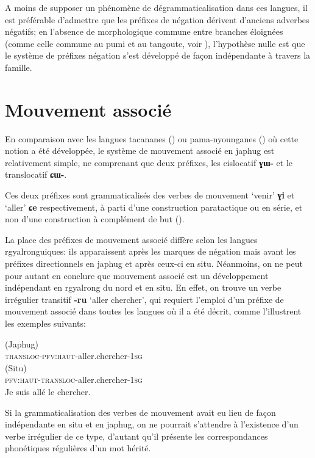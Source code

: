 \documentclass[oldfontcommands,oneside,a4paper,11pt]{article}
\newcommand{\ipa}[1]{{\phon\textbf{\mbox{#1}}}} %
\begin{document}
A moins de supposer un phénomène de dégrammaticalisation dans ces langues, il est préférable d'admettre que les préfixes de négation dérivent d'anciens adverbes négatifs; en l'absence de morphologique  commune entre branches éloignées (comme celle commune au pumi et au tangoute, voir \citealt{jacques11tangut.verb}), l'hypothèse nulle est que le système de préfixes négation s'est développé de façon indépendante à travers la famille.

\section{Mouvement associé} 
En comparaison avec les langues tacananes (\citealt{guillaume09mouv.assoc}) ou pama-nyounganes (\citealt{koch84associated.motion}) où cette notion a été développée, le système de mouvement associé en japhug est relativement simple, ne comprenant que deux préfixes, les cislocatif \ipa{ɣɯ-} et le translocatif \ipa{ɕɯ-}.

Ces deux préfixes sont grammaticalisés des verbes de mouvement `venir' \ipa{ɣi} et `aller' \ipa{ɕe} respectivement, à parti d'une construction paratactique ou en série, et non d'une construction à complément de but (\citealt{jacques13harmonization}).

La place des préfixes de mouvement associé diffère selon les langues rgyalronguiques: ils apparaissent après les marques de négation mais avant les préfixes directionnels en japhug et après ceux-ci en situ. Néanmoins, on ne peut pour autant en conclure que  mouvement associé est un développement indépendant en rgyalrong du nord et en situ. En effet, on trouve un verbe irrégulier transitif \ipa{-ru} `aller chercher', qui requiert l'emploi d'un préfixe de mouvement associé dans toutes les langues où il a été décrit, comme l'illustrent les exemples suivants:

\begin{exe}
 \ex  
 \gll  \ipa{\textbf{ɕ}-tɤ-ru-t-a}  (Japhug) \\
 \textsc{transloc-pfv:haut}-aller.chercher-\textsc{1sg} \\
\ex  
 \gll  \ipa{rə-\textbf{ɕɐ}-rô-ŋ}  (Situ) \\
 \textsc{pfv:haut-transloc}-aller.chercher-\textsc{1sg} \\
\glt Je suis allé le chercher.
\end{exe}
 Si la grammaticalisation des verbes de mouvement avait eu lieu de façon indépendante en situ et en japhug, on ne pourrait s'attendre à l'existence d'un verbe irrégulier de ce type, d'autant qu'il présente les correspondances phonétiques régulières d'un mot hérité.
\end{document}
